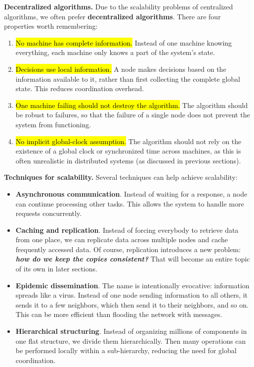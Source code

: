 \textcolor{Green3}{ \textbf{Decentralized algorithms.}} Due to the scalability problems of centralized algorithms, we often prefer \textbf{decentralized algorithms}. There are four properties worth remembering:
\begin{enumerate}
    \item \hl{No machine has complete information.} Instead of one machine knowing everything, each machine only knows a part of the system's state.

    \item \hl{Decisions use local information.} A node makes decisions based on the information available to it, rather than first collecting the complete global state. This reduces coordination overhead.

    \item \hl{One machine failing should not destroy the algorithm.} The algorithm should be robust to failures, so that the failure of a single node does not prevent the system from functioning.

    \item \hl{No implicit global-clock assumption.} The algorithm should not rely on the existence of a global clock or synchronized time across machines, as this is often unrealistic in distributed systems (as discussed in previous sections).
\end{enumerate}
\textcolor{Green3}{ \textbf{Techniques for scalability.}} Several techniques can help achieve scalability:
\begin{itemize}
    \item \textcolor{Green3}{\textbf{Asynchronous communication}}. Instead of waiting for a response, a node can continue processing other tasks. This allows the system to handle more requests concurrently.

    \item \textcolor{Green3}{\textbf{Caching and replication}}. Instead of forcing everybody to retrieve data from one place, we can replicate data across multiple nodes and cache frequently accessed data. Of course, replication introduces a new problem: \emph{\textbf{how do we keep the copies consistent?}} That will become an entire topic of its own in later sections.

    \item \textcolor{Green3}{\textbf{Epidemic dissemination}}. The name is intentionally evocative: information spreads like a virus. Instead of one node sending information to all others, it sends it to a few neighbors, which then send it to their neighbors, and so on. This can be more efficient than flooding the network with messages.

    \item \textcolor{Green3}{\textbf{Hierarchical structuring}}. Instead of organizing millions of components in one flat structure, we divide them hierarchically. Then many operations can be performed locally within a sub-hierarchy, reducing the need for global coordination.
\end{itemize}
